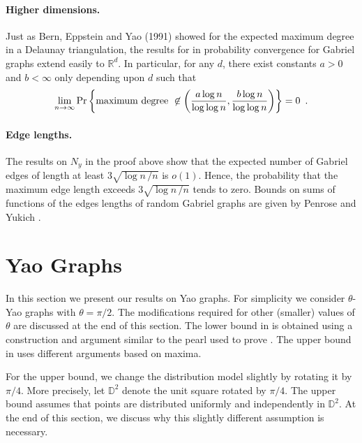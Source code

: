 \documentclass[lotsofwhite,charterfonts]{patmorin}
\newcommand{\RR}{\mathbb{R}}
\newcommand{\D}{\mathbb{D}}
\newcommand{\PROB}{\Pr}
\newcommand{\EXP}{\mathrm{E}}
\begin{document}
\paragraph{Higher dimensions.}
Just as Bern, Eppstein and Yao (1991) showed for the
expected maximum degree in a Delaunay triangulation, 
the results for in probability convergence for Gabriel graphs
extend easily to $\RR^d$. In particular,
for any $d$, there exist constants $a>0$ and $b < \infty$ 
only depending upon $d$ such that
\[
\lim_{n\to\infty} \PROB \left\{ \hbox{\rm maximum degree}~\not\in 
  \left( {a \log n \over \log \log n} , { b \log n \over \log \log n} \right)
  \right\} = 0 \enspace .
\]

\paragraph{Edge lengths.}
The results on $N_y$ in the proof above show that the expected number of
Gabriel edges of length at least $3 \sqrt{\log n \,/n}$ is $o(1)$. Hence,
the probability that the maximum edge length exceeds $3 \sqrt{\log n
\,/n}$ tends to zero.  Bounds on sums of functions of the edges lengths
of random Gabriel graphs are given by Penrose and Yukich \cite{py03}.


\section{Yao Graphs}

In this section we present our results on Yao graphs.  For simplicity
we consider $\theta$-Yao graphs with $\theta=\pi/2$.  The modifications
required for other (smaller) values of $\theta$ are discussed at the end
of this section.  The lower bound in  is obtained
using a construction and argument similar to the pearl used to prove
.  The upper bound in 
uses different arguments based on maxima.

For the upper bound, we change the distribution model slightly by rotating
it by $\pi/4$.  More precisely, let $\D^2$ denote the unit square rotated
by $\pi/4$.  The upper bound assumes that points are distributed uniformly
and independently in $\D^2$. At the end of this section, we discuss why
this slightly different assumption is necessary.
\end{document}
